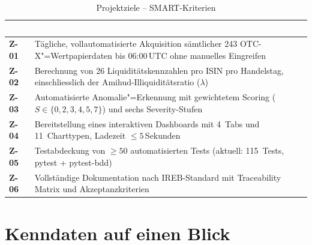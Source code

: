 \documentclass[11pt, a4paper, oneside, openany]{report}
\begin{document}
\begin{table}[H]
\centering
\caption{Projektziele -- SMART-Kriterien}
\label{tab:smart}
\sffamily\small
\begin{tabularx}{\textwidth}{>{\bfseries\sffamily\color{SwissRed}}l X}
  \toprule
  \rowcolor{DeepNavy} \textcolor{white}{\textbf{Ziel}} & \textcolor{white}{\textbf{Beschreibung \& Messkriterium}} \\
  \midrule
  Z-01 & Tägliche, vollautomatisierte Akquisition sämtlicher 243 OTC-X"=Wertpapierdaten bis 06:00\,UTC ohne manuelles Eingreifen \\
  Z-02 & Berechnung von 26 Liquiditätskennzahlen pro ISIN pro Handelstag, einschliesslich der Amihud-Illiquiditätsratio ($\lambda$) \\
  Z-03 & Automatisierte Anomalie"=Erkennung mit gewichtetem Scoring ($S \in \{0,2,3,4,5,7\}$) und sechs Severity-Stufen \\
  Z-04 & Bereitstellung eines interaktiven Dashboards mit 4~Tabs und 11~Charttypen, Ladezeit $\leq 5$\,Sekunden \\
  Z-05 & Testabdeckung von $\geq 50$ automatisierten Tests (aktuell: 115~Tests, pytest + pytest-bdd) \\
  Z-06 & Vollständige Dokumentation nach IREB-Standard mit Traceability Matrix und Akzeptanzkriterien \\
  \bottomrule
\end{tabularx}
\end{table}

\section{Kenndaten auf einen Blick}
\label{sec:kenndaten}
\end{document}
